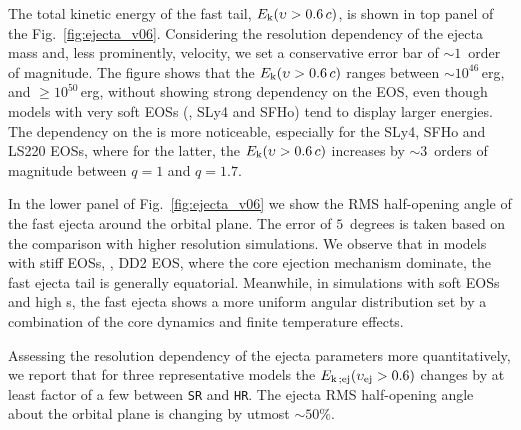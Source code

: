 The total kinetic energy of the fast tail, $E_{\rm k}(\upsilon > 0.6\, c)$,
is shown in top panel of the Fig.~\ref{fig:ejecta_v06}.
Considering the resolution dependency of the ejecta mass and, less prominently, velocity, 
we set a conservative error bar of ${\sim}1$~order of magnitude.
%
The figure shows that the $E_{\rm k}(\upsilon > 0.6\, c)$ ranges between 
${\sim}10^{46}\,$erg, and ${\geq}10^{50}\,$erg, without showing 
strong dependency on the \ac{EOS}, even though models with very soft \acp{EOS} 
(\eg, SLy4 and SFHo) tend to display larger energies. 
%
The dependency on the \mr{} is more noticeable, especially for the 
SLy4, SFHo and LS220 \acp{EOS}, where for the latter, the 
$E_{\rm k}(\upsilon > 0.6\, c)$ 
increases by ${\sim3}\,$ orders of magnitude between $q=1$ and $q=1.7$. 

In the lower panel of Fig.~\ref{fig:ejecta_v06} we show the \ac{RMS} 
half-opening angle of the fast ejecta around the orbital plane. 
The error of $5$~degrees is taken based on the comparison with higher resolution
simulations. 
%
%
We observe that in models with stiff \acp{EOS}, \eg, DD2 \ac{EOS}, where the 
core \bnc{} ejection mechanism dominate, the fast ejecta tail is generally equatorial.
Meanwhile, in simulations with soft \acp{EOS} and high \mr{}s, the fast ejecta shows 
a more uniform angular distribution set by a combination of the core dynamics and 
finite temperature effects.%

Assessing the resolution dependency of the ejecta parameters more quantitatively,
we report that for three representative models 
the $E_{\rm k \,; ej}(\upsilon_{\text{ej}} > 0.6)$ changes
by at least factor of a few
between \texttt{SR} and \texttt{HR}. 
The ejecta \ac{RMS} half-opening angle about the 
orbital plane is changing by utmost ${\sim}50\%$.

